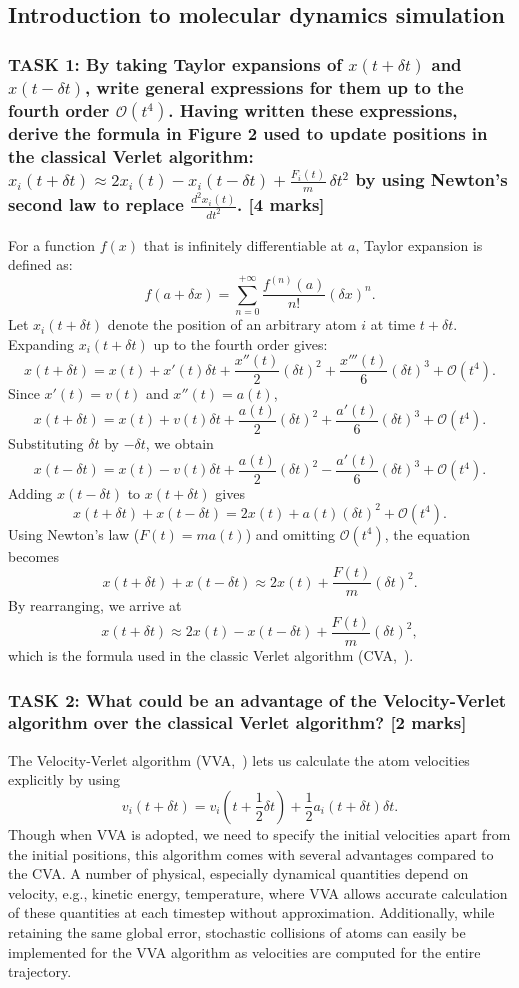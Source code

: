 \documentclass[a4paper,10pt,twocolumn]{article}
\begin{document}
\subsection{Introduction to molecular dynamics simulation}
\subsubsection*{TASK 1: By taking Taylor expansions of $x(t+\delta t)$ and $x(t-\delta t)$, write general expressions for them up to the fourth order $\mathcal{O}(t^4)$. Having written these expressions, derive the formula in Figure 2 used to update positions in the classical Verlet algorithm: $x_i(t+\delta t)\approx2x_i(t)-x_i(t-\delta t)+\frac{F_i(t)}{m}\,\delta t^2$ by using Newton’s second law to replace $\frac{d^2 x_i(t)}{dt^2}$. [4 marks]}

For a function $f(x)$ that is infinitely differentiable at $a$, Taylor expansion is defined as:
\[
f(a+\delta x)=\sum_{n=0}^{+\infty}\frac{f^{(n)}(a)}{n!}(\delta x)^n.
\]
Let $x_i(t+\delta t)$ denote the position of an arbitrary atom $i$ at time $t+\delta t$. Expanding $x_i(t+\delta t)$ up to the fourth order gives:
\[
x(t+\delta t)=x(t)+x'(t)\delta t+\frac{x''(t)}{2}(\delta t)^2+\frac{x'''(t)}{6}(\delta t)^3+\mathcal{O}(t^4).
\]
Since $x'(t)=v(t)$ and $x''(t)=a(t)$,
\[
x(t+\delta t)=x(t)+v(t)\delta t+\frac{a(t)}{2}(\delta t)^2+\frac{a'(t)}{6}(\delta t)^3+\mathcal{O}(t^4).
\]
Substituting $\delta t$ by $-\delta t$, we obtain
\[
x(t-\delta t)=x(t)-v(t)\delta t+\frac{a(t)}{2}(\delta t)^2-\frac{a'(t)}{6}(\delta t)^3+\mathcal{O}(t^4).
\]
Adding $x(t-\delta t)$ to $x(t+\delta t)$ gives
\[
x(t+\delta t)+x(t-\delta t)=2x(t)+a(t)(\delta t)^2+\mathcal{O}(t^4).
\]
Using Newton's law ($F(t)=ma(t)$) and omitting $\mathcal{O}(t^4)$, the equation becomes
\[
x(t+\delta t)+x(t-\delta t)\approx2x(t)+\frac{F(t)}{m}(\delta t)^2.
\]
By rearranging, we arrive at
\[
x(t+\delta t)\approx 2x(t)-x(t-\delta t)+\frac{F(t)}{m}(\delta t)^2,
\]
which is the formula used in the classic Verlet algorithm (CVA,~\cite{verlet1967computer}).

\subsubsection*{TASK 2: What could be an advantage of the Velocity-Verlet algorithm over the classical Verlet algorithm? [2 marks]}

The Velocity-Verlet algorithm (VVA,~\cite{swope1982computer}) lets us calculate the atom velocities explicitly by using
\[
v_i(t+\delta t)=v_i(t+\frac{1}{2}\delta t)+\frac{1}{2}a_i(t+\delta t)\delta t.
\]
Though when VVA is adopted, we need to specify the initial velocities apart from the initial positions, this algorithm comes with several advantages compared to the CVA. A number of physical, especially dynamical quantities depend on velocity, e.g., kinetic energy, temperature, where VVA allows accurate calculation of these quantities at each timestep without approximation. Additionally, while retaining the same global error, stochastic collisions of atoms can easily be implemented for the VVA algorithm as velocities are computed for the entire trajectory.~\cite{andersen1983rattle}
\end{document}
